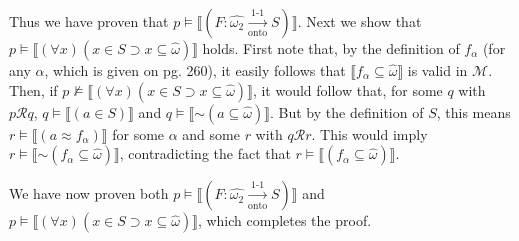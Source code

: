 \documentclass{article}
\newcommand*{\oldneg}{\mathord{\sim}}
\newcommand{\lbc}{\llbracket}
\newcommand{\rbc}{\rrbracket}
\theoremstyle{definition}
\begin{document}
Thus we have proven that $p\vDash\lbc (F:\widehat{\omega_2}\xrightarrow[\textrm{onto}]{\text{1-1}}S)\rbc$. Next we show that 
$p\vDash\lbc (\forall x)(x\in S\supset x\subseteq\hat{\omega})\rbc$ holds. First note that, by the definition of 
$f_\alpha$ (for any $\alpha$, which is given on pg. 260), it easily follows that 
$\lbc f_\alpha\subseteq\hat{\omega}\rbc$ is valid in $\mathcal{M}$. Then, if 
$p\nvDash\lbc (\forall x)(x\in S\supset x\subseteq\hat{\omega})\rbc$, it would follow that, for some $q$ with $p\mathcal{R}q$,
$q\vDash\lbc (a\in S)\rbc$ and $q\vDash\lbc\oldneg (a\subseteq\hat{\omega})\rbc$. But by the definition of $S$, this means 
$r\vDash\lbc (a\approx f_\alpha)\rbc$ for some $\alpha$ and some $r$ with $q\mathcal{R}r$. This would imply 
$r\vDash\lbc\oldneg (f_\alpha\subseteq\hat{\omega})\rbc$, contradicting the fact that 
$r\vDash\lbc (f_\alpha\subseteq\hat{\omega})\rbc$.

We have now proven both $p\vDash\lbc (F:\widehat{\omega_2}\xrightarrow[\textrm{onto}]{\text{1-1}}S)\rbc$
and $p\vDash\lbc (\forall x)(x\in S\supset x\subseteq\hat{\omega})\rbc$, which completes the proof.
\end{document}

